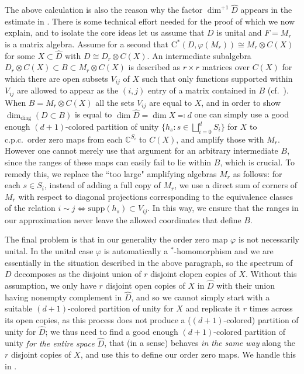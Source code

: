\documentclass[11pt,a4paper]{amsart}
\theoremstyle{definition}
\numberwithin{equation}{section}
\newcommand{\bb}[1]{\mathbb{#1}}
\def\supp{\mathrm{supp}}
\begin{document}
The above calculation is also the reason why the factor $\dim^{+1}\widehat{D}$ appears in the estimate in . There is some technical effort needed for the proof of  which we now explain, and to isolate the core ideas let us assume that $D$ is unital and $F=M_r$ is a matrix algebra. Assume for a second that $\mathrm{C}^\ast(D,\varphi(M_r))\cong M_r\otimes C(X)$ for some $X\subset \widehat{D}$ with $D\cong D_r\otimes C(X)$. An intermediate subalgebra $D_r\otimes C(X) \subset B\subset M_r\otimes C(X)$ is described as $r\times r$ matrices over $C(X)$ for which there are open subsets $V_{ij}$ of $X$ such that only functions supported within $V_{ij}$ are allowed to appear as the $(i,j)$ entry of a matrix contained in $B$ (cf.\ ). When $B= M_r\otimes C(X)$ all the sets $V_{ij}$ are equal to $X$, and in order to show $\dim_{\mathrm{diag}}(D\subset B)$ is equal to $\dim\widehat{D}=\dim X\eqqcolon d$ one can simply use a good enough $(d+1)$-colored partition of unity $\{h_s: s\in \bigsqcup_{i=0}^dS_i\}$ for $X$ to c.p.c.\ order zero maps from each $\bb{C}^{S_i}$ to $C(X)$, and amplify those with $M_r$. However one cannot merely use that argument for an arbitrary intermediate $B$, since the ranges of these maps can easily fail to lie within $B$, which is crucial. To remedy this, we replace the ``too large" amplifying algebras $M_r$ as follows: for each $s\in S_i$, instead of adding a full copy of $M_r$, we use a direct sum of corners of $M_r$ with respect to diagonal projections corresponding to the equivalence classes of the relation $i\sim j\iff\supp(h_s)\subset V_{ij}$. In this way, we ensure that the ranges in our approximation never leave the allowed coordinates that define $B$.

The final problem is that in our generality the order zero map $\varphi$ is not necessarily unital. In the unital case $\varphi$ is automatically a $^*$-homomorphism and we are essentially in the situation described in the above paragraph, so the spectrum of $D$ decomposes as the disjoint union of $r$ disjoint clopen copies of $X$. Without this assumption, we only have $r$ disjoint open copies of $X$ in $\widehat{D}$ with their union having nonempty complement in $\widehat{D}$, and so we cannot simply start with a suitable $(d+1)$-colored partition of unity for $X$ and replicate it $r$ times across its open copies, as this process does not produce a ($(d+1)$-colored) partition of unity for $\widehat{D}$; we thus need to find a good enough $(d+1)$-colored partition of unity \emph{for the entire space $\widehat{D}$}, that (in a sense) behaves \emph{in the same way} along the $r$ disjoint copies of $X$, and use this to define our order zero maps. We handle this in .
\end{document}
